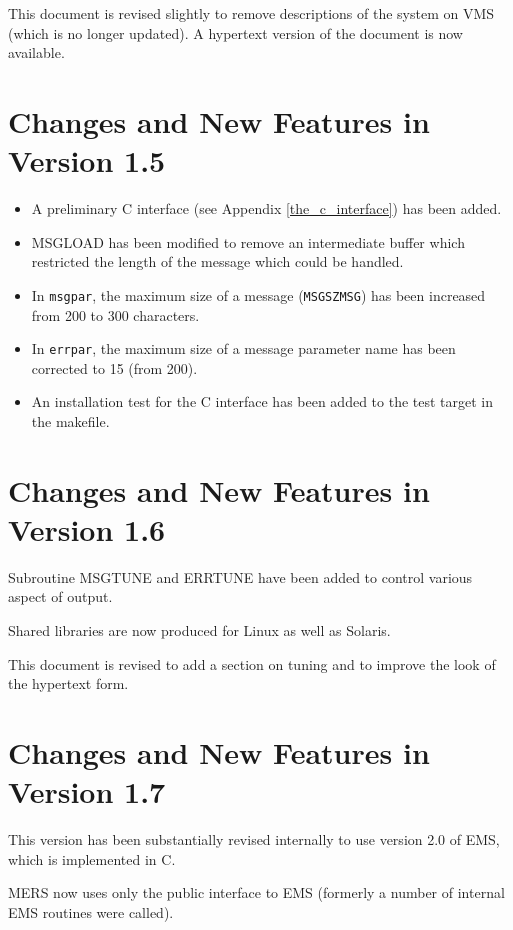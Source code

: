 \documentclass[twoside,11pt]{article}
\newcommand{\htmlref}[2]{#1}
\newcommand{\latex}[1]{#1}
\newcommand{\xref}[3]{#1}
\newcommand{\xlabel}[1]{}
\renewcommand{\_}{\texttt{\symbol{95}}}
\begin{document}
This document is revised slightly to remove descriptions of the system on VMS
(which is no longer updated). A hypertext version of the document is now
available.

\section{\xlabel{changes_and_new_features_in_version_1_5}Changes and New Features in Version 1.5}
\begin{itemize}
\item A preliminary 
\htmlref{C interface}{the_c_interface}\latex{ (see Appendix
\ref{the_c_interface})} has been added.
\item MSG\_LOAD has been modified to remove an intermediate buffer which
restricted the length of the message which could be handled.
\item In \texttt{msg\_par}, the maximum size of a message 
(\texttt{MSG\_\_SZMSG}) has been increased from 200 to 300 characters.
\item In \texttt{err\_par}, the maximum size of a message parameter name has
been corrected to 15 (from 200).
\item An installation test for the C interface has been added to the test
target in the makefile.
\end{itemize}

\section{\xlabel{changes_and_new_features_in_version_1_6}Changes and New Features in Version 1.6}
Subroutine 
\htmlref{MSG\_TUNE}{MSG_TUNE}
and
\htmlref{ERR\_TUNE}{ERR_TUNE}
have been added to control various aspect of output.

Shared libraries are now produced for Linux as well as Solaris.

This document is revised to add a section on 
\htmlref{tuning}{tuning} and to improve the look of the hypertext form.

\section{\xlabel{changes_and_new_features_in_version_1_7}Changes and New Features in Version 1.7}
This version has been substantially revised internally to use version 2.0 of
\xref{EMS}{ssn4}{},
which is implemented in C.

MERS now uses only the public interface to EMS (formerly a number of internal
EMS routines were called).
\end{document}
